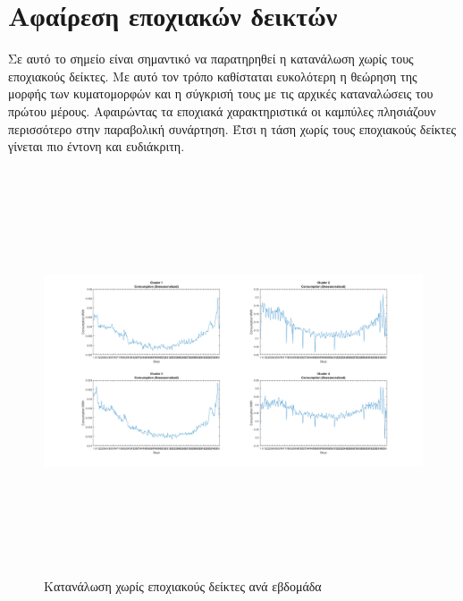 \documentclass[a4paper, 11pt]{article}
\begin{document}
\section{Αφαίρεση εποχιακών δεικτών}
Σε αυτό το σημείο είναι σημαντικό να παρατηρηθεί η κατανάλωση χωρίς τους εποχιακούς δείκτες. Με αυτό τον τρόπο καθίσταται ευκολότερη η θεώρηση της μορφής των κυματομορφών και η σύγκρισή τους με τις αρχικές καταναλώσεις του πρώτου μέρους. Αφαιρώντας τα εποχιακά χαρακτηριστικά οι καμπύλες πλησιάζουν περισσότερο στην παραβολική συνάρτηση. Έτσι η τάση χωρίς τους εποχιακούς δείκτες γίνεται πιο έντονη και ευδιάκριτη.
\begin{figure}[ht!]
\centering
\includegraphics[width=180mm, height=120mm]{../../plots/Trend_estimation/Deseasonalized_ALL.png}
\caption{Κατανάλωση χωρίς εποχιακούς δείκτες ανά εβδομάδα\label{deseasweek}}
\end{figure}
\newpage
\end{document}
